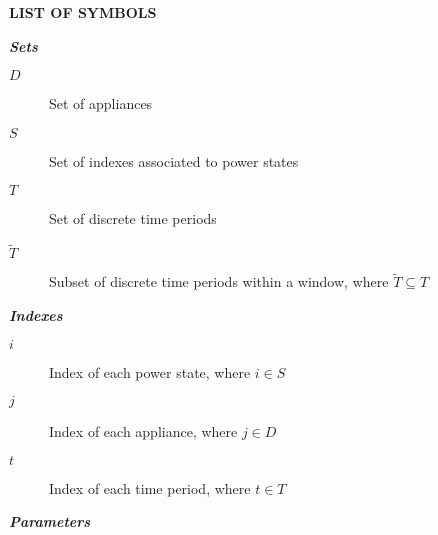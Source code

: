 \newpage

\begin{center}
  \large{\textbf{LIST OF SYMBOLS}}
\end{center}




\noindent \emph{\textbf{Sets}}


\vspace{4pt}

\begin{description}
    \item [{$D$}]           Set of appliances
    \item [{$S$}]           Set of indexes associated to power states
    \item [{$T$}]           Set of discrete time periods
    \item [{$\tilde{T}$}]   Subset of discrete time periods within a window, where $\tilde{T} \subseteq T$

\end{description}

\vspace{4pt}

\noindent \emph{\textbf{Indexes}}

\vspace{4pt}

\begin{description}
    \item [{$i$}]   Index of each power state, where $i \in S$
    \item [{$j$}]   Index of each appliance, where $j \in D$
    \item [{$t$}]   Index of each time period, where $t \in T$

\end{description}

\vspace{4pt}

\noindent \emph{\textbf{Parameters}}

\vspace{4pt}

